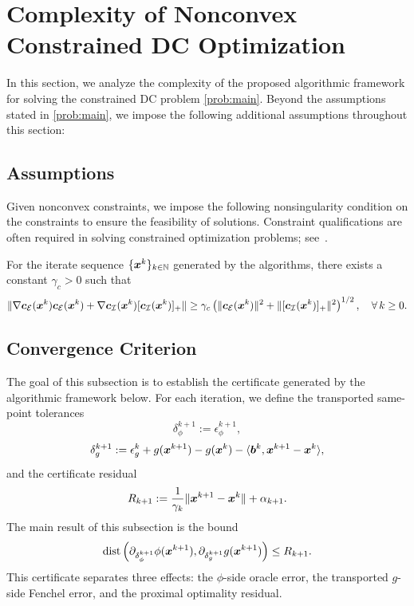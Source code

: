 \section{Complexity of Nonconvex Constrained DC Optimization}
\label{sec:complexity-analysis-NCDCA}
In this section, we analyze the complexity of the proposed algorithmic framework for solving the constrained DC problem \eqref{prob:main}. Beyond the assumptions stated in \eqref{prob:main}, we impose the following additional assumptions throughout this section:

\subsection{Assumptions}
Given nonconvex constraints, we impose the following nonsingularity condition on the constraints to ensure the feasibility of solutions. Constraint qualifications are often required in solving constrained optimization problems; see~\cite{shi2025momentum,lu2024variancereducedfirstordermethodsdeterministically,liu2025single,curtis2024worst}.
\begin{assumption}
    \label{Ass: constraints conditions} 
    {For the iterate sequence $\{\bm{x}^k\}_{k\in\mathbb{N}}$ generated by the algorithms,} there exists a constant $\gamma_c > 0$ such that
    \begin{align*}
        \|\nabla \bm{c}_{\mathcal{E}}(\bm{x}^k)\bm{c}_{\mathcal{E}}(\bm{x}^k)
        +\nabla \bm{c}_{\mathcal{I}}(\bm{x}^k)[\bm{c}_{\mathcal{I}}(\bm{x}^k)]_+\|
        \geq
        \gamma_c
        \left(\|\bm{c}_{\mathcal{E}}(\bm{x}^k)\|^2+\|[\bm{c}_{\mathcal{I}}(\bm{x}^k)]_+\|^2\right)^{1/2},
        \quad \forall\, k \geq 0.
    \end{align*}
\end{assumption}

\subsection{Convergence Criterion}
\label{subsec:Convergence Criterion of KKT}

The goal of this subsection is to establish the certificate generated by
the algorithmic framework below. For each iteration, we define
the transported same-point tolerances
\[
    \delta_\phi^{k+1}:=\epsilon_\phi^{k+1},
\]
\[
    \delta_g^{k+1}
    :=
    \epsilon_g^k
    +g(\bm{x}^{k+1})-g(\bm{x}^k)
    -\langle \bm{b}^k,\bm{x}^{k+1}-\bm{x}^k\rangle,
\]
and the certificate residual
\[
    R_{k+1}
    :=
    \frac{1}{\gamma_k}\|\bm{x}^{k+1}-\bm{x}^k\|
    +\alpha_{k+1}.
\]
The main result of this subsection is the bound
\[
    \operatorname{dist}
    \left(
        \partial_{\delta_\phi^{k+1}}\phi(\bm{x}^{k+1}),
        \partial_{\delta_g^{k+1}}g(\bm{x}^{k+1})
    \right)
    \le R_{k+1}.
\]
This certificate separates three effects: the $\phi$-side oracle error,
the transported $g$-side Fenchel error, and the proximal optimality
residual.

